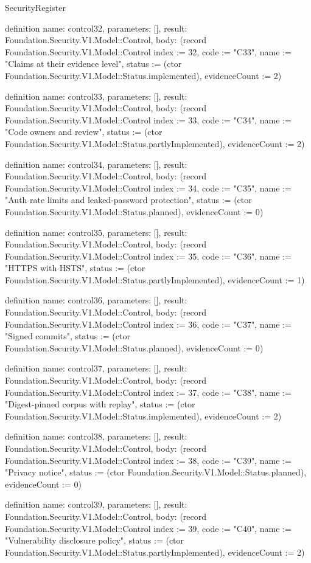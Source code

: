 \begin{lexlean}{SecurityRegister}
\begin{semanticmodule}
definition{
  name: control32,
  parameters: [],
  result: Foundation.Security.V1.Model::Control,
  body: (record Foundation.Security.V1.Model::Control {index := 32, code := "C33", name := "Claims at their evidence level", status := (ctor Foundation.Security.V1.Model::Status.implemented), evidenceCount := 2})
}

definition{
  name: control33,
  parameters: [],
  result: Foundation.Security.V1.Model::Control,
  body: (record Foundation.Security.V1.Model::Control {index := 33, code := "C34", name := "Code owners and review", status := (ctor Foundation.Security.V1.Model::Status.partlyImplemented), evidenceCount := 2})
}

definition{
  name: control34,
  parameters: [],
  result: Foundation.Security.V1.Model::Control,
  body: (record Foundation.Security.V1.Model::Control {index := 34, code := "C35", name := "Auth rate limits and leaked-password protection", status := (ctor Foundation.Security.V1.Model::Status.planned), evidenceCount := 0})
}

definition{
  name: control35,
  parameters: [],
  result: Foundation.Security.V1.Model::Control,
  body: (record Foundation.Security.V1.Model::Control {index := 35, code := "C36", name := "HTTPS with HSTS", status := (ctor Foundation.Security.V1.Model::Status.partlyImplemented), evidenceCount := 1})
}

definition{
  name: control36,
  parameters: [],
  result: Foundation.Security.V1.Model::Control,
  body: (record Foundation.Security.V1.Model::Control {index := 36, code := "C37", name := "Signed commits", status := (ctor Foundation.Security.V1.Model::Status.planned), evidenceCount := 0})
}

definition{
  name: control37,
  parameters: [],
  result: Foundation.Security.V1.Model::Control,
  body: (record Foundation.Security.V1.Model::Control {index := 37, code := "C38", name := "Digest-pinned corpus with replay", status := (ctor Foundation.Security.V1.Model::Status.implemented), evidenceCount := 2})
}

definition{
  name: control38,
  parameters: [],
  result: Foundation.Security.V1.Model::Control,
  body: (record Foundation.Security.V1.Model::Control {index := 38, code := "C39", name := "Privacy notice", status := (ctor Foundation.Security.V1.Model::Status.planned), evidenceCount := 0})
}

definition{
  name: control39,
  parameters: [],
  result: Foundation.Security.V1.Model::Control,
  body: (record Foundation.Security.V1.Model::Control {index := 39, code := "C40", name := "Vulnerability disclosure policy", status := (ctor Foundation.Security.V1.Model::Status.partlyImplemented), evidenceCount := 2})
}


\end{semanticmodule}
\end{lexlean}
